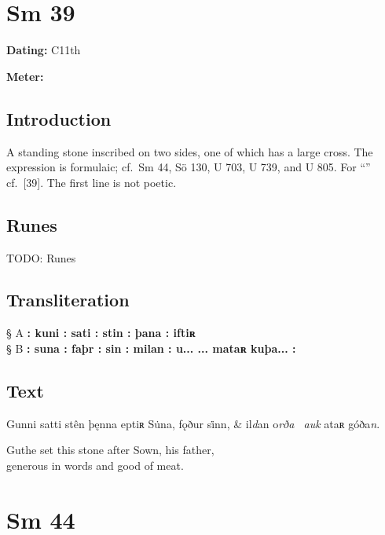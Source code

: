 \sectionline\clearpage


\section{Sm 39}

\begin{flushright}%
\textbf{Dating:} C11th

\textbf{Meter:} \Fornyrdislag
\end{flushright}%

\subsection{Introduction}

A standing stone inscribed on two sides, one of which has a large cross.  The expression is formulaic; cf.~Sm 44, Sö 130, U 703, U 739, and U 805.  For “” cf.~[39].  The first line is not poetic.

\subsection{Runes}

TODO: Runes%

\subsection{Transliteration}

§ A \textbf{: kuni : sati : stin : þana : iftiʀ} \\
§ B \textbf{: suna : faþr : sin : milan : u... ... mataʀ kuþa... :}

\subsection{Text}

\bvg\bva[]%
Gunni satti stên þęnna eptiʀ Su̇na, fǫður si̇nn, &
il\emph{d}an o\emph{rða \hld\ auk} ataʀ góða\emph{n}.\eva

\bvb Guthe set this stone after Sown, his father, \\
generous in words and good of meat.\evb\evg

\sectionline\clearpage


\section{Sm 44}

